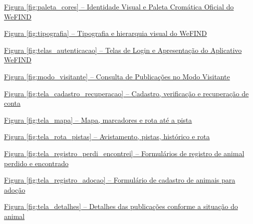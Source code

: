 \noindent \hyperref[fig:paleta_cores]{Figura \ref*{fig:paleta_cores} -- Identidade Visual e Paleta Cromática Oficial do WeFIND \dotfill \pageref{fig:paleta_cores}}\par\vspace{0.12cm}
\noindent \hyperref[fig:tipografia]{Figura \ref*{fig:tipografia} -- Tipografia e hierarquia visual do WeFIND \dotfill \pageref{fig:tipografia}}\par\vspace{0.12cm}
\noindent \hyperref[fig:telas_autenticacao]{Figura \ref*{fig:telas_autenticacao} -- Telas de Login e Apresentação do Aplicativo WeFIND \dotfill \pageref{fig:telas_autenticacao}}\par\vspace{0.12cm}
\noindent \hyperref[fig:modo_visitante]{Figura \ref*{fig:modo_visitante} -- Consulta de Publicações no Modo Visitante \dotfill \pageref{fig:modo_visitante}}\par\vspace{0.12cm}
\noindent \hyperref[fig:tela_cadastro_recuperacao]{Figura \ref*{fig:tela_cadastro_recuperacao} -- Cadastro, verificação e recuperação de conta \dotfill \pageref{fig:tela_cadastro_recuperacao}}\par\vspace{0.12cm}
\noindent \hyperref[fig:tela_mapa]{Figura \ref*{fig:tela_mapa} -- Mapa, marcadores e rota até a pista \dotfill \pageref{fig:tela_mapa}}\par\vspace{0.12cm}
\noindent \hyperref[fig:tela_rota_pistas]{Figura \ref*{fig:tela_rota_pistas} -- Avistamento, pistas, histórico e rota \dotfill \pageref{fig:tela_rota_pistas}}\par\vspace{0.12cm}
\noindent \hyperref[fig:tela_registro_perdi_encontrei]{Figura \ref*{fig:tela_registro_perdi_encontrei} -- Formulários de registro de animal perdido e encontrado \dotfill \pageref{fig:tela_registro_perdi_encontrei}}\par\vspace{0.12cm}
\noindent \hyperref[fig:tela_registro_adocao]{Figura \ref*{fig:tela_registro_adocao} -- Formulário de cadastro de animais para adoção \dotfill \pageref{fig:tela_registro_adocao}}\par\vspace{0.12cm}
\noindent \hyperref[fig:tela_detalhes]{Figura \ref*{fig:tela_detalhes} -- Detalhes das publicações conforme a situação do animal \dotfill \pageref{fig:tela_detalhes}}\par\vspace{0.12cm}
